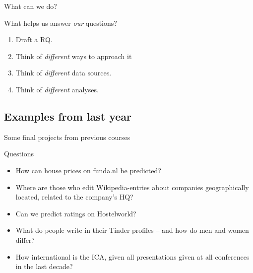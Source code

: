\documentclass{beamer}
\begin{document}
\begin{frame}{What can we do?}
\begin{block}{What helps us answer \emph{our} questions?}
\begin{enumerate}
\item Draft a RQ.
\item Think of \emph{different} ways to approach it
\item Think of \emph{different} data sources.
\item Think of \emph{different} analyses.
\end{enumerate}
\end{block}
\end{frame}


\subsection{Examples from last year}
\begin{frame}{Some final projects from previous courses}
\begin{block}{Questions}
\begin{itemize}
\item How can house prices on funda.nl be predicted?
\item Where are those who edit Wikipedia-entries about companies geographically located, related to the company's HQ?
\item Can we predict ratings on Hostelworld?
\item What do people write in their Tinder profiles -- and how do men and women differ?
\item How international is the ICA, given all presentations given at all conferences in the last decade?
\end{itemize}
\end{block}

\end{frame}
\end{document}
